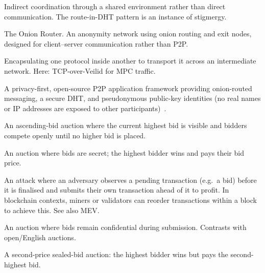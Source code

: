 \begin{description}[style=nextline, labelwidth=5cm, leftmargin=5.5cm]
  \item[Stigmergy] Indirect coordination through a shared environment rather than direct communication. The route-in-DHT pattern is an instance of stigmergy.
  \item[Tor] The Onion Router. An anonymity network using onion routing and exit nodes, designed for client--server communication rather than P2P.
  \item[Tunnelling] Encapsulating one protocol inside another to transport it across an intermediate network. Here: TCP-over-Veilid for MPC traffic.
  \item[Veilid] A privacy-first, open-source P2P application framework providing onion-routed messaging, a secure DHT, and pseudonymous public-key identities (no real names or IP addresses are exposed to other participants)~\cite{veilid_developer_book}.

  \item[English auction] An ascending-bid auction where the current highest bid is visible and bidders compete openly until no higher bid is placed.
  \item[First-price sealed-bid] An auction where bids are secret; the highest bidder wins and pays their bid price.
  \item[Front-running] An attack where an adversary observes a pending transaction (e.g.\ a bid) before it is finalised and submits their own transaction ahead of it to profit. In blockchain contexts, miners or validators can reorder transactions within a block to achieve this. See also MEV.
  \item[Sealed-bid auction] An auction where bids remain confidential during submission. Contrasts with open/English auctions.
  \item[Vickrey auction] A second-price sealed-bid auction: the highest bidder wins but pays the second-highest bid.


\end{description}
